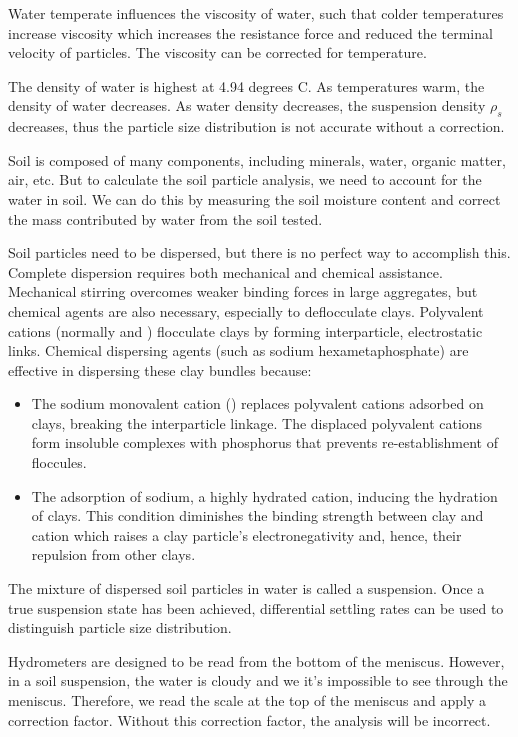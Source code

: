 \documentclass{tufte-handout}
\begin{document}
\begin{description}
	\item[Temperature and Viscosity] Water temperate influences the viscosity of water, such that colder temperatures increase viscosity which increases the resistance force and reduced the terminal velocity of particles. The viscosity can be corrected for temperature.
	\item[Temperature and Density] The density of water is highest at 4.94 degrees C. As temperatures warm, the density of water decreases. As water density decreases, the suspension density $\rho_s$ decreases, thus the particle size distribution is not accurate without a correction. 
	\item[Soil Weight and Hygroscopic Water] Soil is composed of many components, including minerals, water, organic matter, air, etc. But to calculate the soil particle analysis, we need to account for the water in soil. We can do this by measuring the soil moisture content and correct the mass contributed by water from the soil tested.
	\item[Aggregated Soil Particles] Soil particles need to be dispersed, but there is no perfect way to accomplish this. Complete dispersion requires both mechanical and chemical assistance. Mechanical stirring overcomes weaker binding forces in large aggregates, but chemical agents are also necessary, especially to deflocculate clays. Polyvalent cations (normally  and ) flocculate clays by forming interparticle, electrostatic links. Chemical dispersing agents (such as sodium hexametaphosphate) are effective in dispersing these clay bundles because:
	
	\begin{itemize}
		\item The sodium monovalent cation () replaces polyvalent cations adsorbed on clays, breaking the interparticle linkage. The displaced polyvalent cations form insoluble complexes with phosphorus that prevents re-establishment of floccules.
		\item The adsorption of sodium, a highly hydrated cation, inducing the hydration of clays. This condition diminishes the binding strength between clay and cation which raises a clay particle's electronegativity and, hence, their repulsion from other clays.
	\end{itemize}
	
The mixture of dispersed soil particles in water is called a suspension. Once a true suspension state has been achieved, differential settling rates can be used to distinguish particle size distribution.
	
	\item Hydrometers are designed to be read from the bottom of the meniscus. However, in a soil suspension, the water is cloudy and we it's impossible to see through the meniscus. Therefore, we read the scale at the top of the meniscus and apply a correction factor. Without this correction factor, the analysis will be incorrect. 
\end{description}
\end{document}
